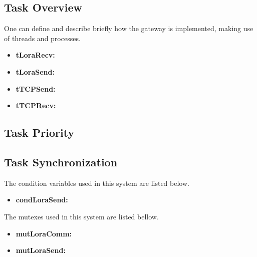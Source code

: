 \subsection{Task Overview}
One can define and describe briefly how the gateway is implemented, making use of threads and processes.

\begin{itemize}
	\item \textbf{tLoraRecv: }
	\item \textbf{tLoraSend: }
	\item \textbf{tTCPSend: }
	\item \textbf{tTCPRecv: }
\end{itemize}

\subsection{Task Priority}

\subsection{Task Synchronization}

The condition variables used in this system are listed below.

\begin{itemize}
	\item \textbf{condLoraSend: }
		
\end{itemize}

The mutexes used in this system are listed bellow.

\begin{itemize}
	\item \textbf{mutLoraComm: }
	\item \textbf{mutLoraSend: }	
\end{itemize}



